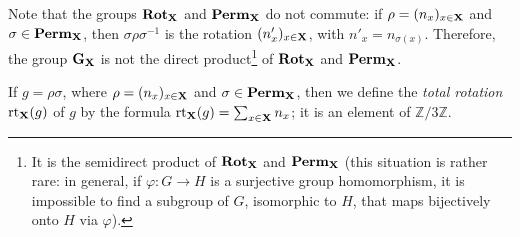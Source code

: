 \begin{itemize}
    Note that the groups $\mathbf{Rot}_{\mathbf{X}}$ and $\mathbf{Perm}_{\mathbf{X}}$ do not commute: if $\rho = (n_x)_{x \in \mathbf{X}}$ and $\sigma \in \mathbf{Perm}_{\mathbf{X}}$, then $\sigma \rho \sigma^{-1}$ is the rotation $(n'_{x})_{x \in \mathbf{X}}$, with $n'_{x} = n_{\sigma(x)}.$
    Therefore, the group $\mathbf{G}_{\mathbf{X}}$ is not the direct product\footnote{It is the semidirect product of $\mathbf{Rot}_{\mathbf{X}}$ and $\mathbf{Perm}_{\mathbf{X}}$ (this situation is rather rare: in general, if $\varphi : G \to H$ is a surjective group homomorphism, it is impossible to find a subgroup of $G$, isomorphic to $H$, that maps bijectively onto $H$ via $\varphi$).} of $\mathbf{Rot}_{\mathbf{X}}$ and $\mathbf{Perm}_{\mathbf{X}}$.

    If $g = \rho \sigma$, where $\rho = (n_x)_{x \in \mathbf{X}}$ and $\sigma \in \mathbf{Perm}_{\mathbf{X}}$, then we define the \emph{total rotation} $\mathrm{rt}_{\mathbf{X}}(g)$ of $g$ by the formula
    $\mathrm{rt}_{\mathbf{X}}(g) = \sum_{x \in \mathbf{X}} n_x$; it is an element of $\mathbb{Z} / 3 \mathbb{Z}$.


\end{itemize}
